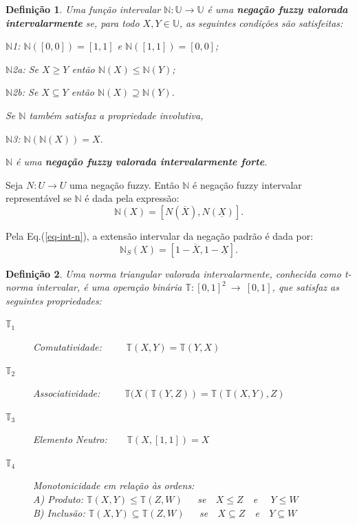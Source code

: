 \documentclass[tcc,capa]{texufpel}
\newtheorem{Def}{Defini\c c\~ao}
\begin{document}
\newpage

\begin{Def}\label{theo-neg}
Uma função intervalar $\mathbb{N}:\mathbb{U}\rightarrow
\mathbb{U}$ é uma \textbf{negação fuzzy valorada intervalarmente} se, para todo
$X,Y \in \mathbb{U}$, as seguintes condições são satisfeitas:
\begin{description}
   \item $\mathbb{N}$1: $\mathbb{N}([0,0]) = [1,1]$ e $\mathbb{N}([1,1]) = [0,0]$;
   \item $\mathbb{N}$2a: Se $X \geq Y$ então $\mathbb{N}(X)\leq
   \mathbb{N}(Y)$;
   \item $\mathbb{N}$2b: Se $X\subseteq Y$ então $\mathbb{N}(X)\supseteq \mathbb{N}(Y)$.
\end{description}
Se $\mathbb{N}$ também satisfaz a propriedade involutiva, 
\begin{description}
\item $\mathbb{N}$3: $\mathbb{N}(\mathbb{N}(X)) = X$.
\end{description}
$\mathbb{N}$
é uma \textbf{negação fuzzy valorada intervalarmente forte}.
\end{Def}

Seja $N: U \rightarrow U$ uma negação fuzzy. Então $\mathbb{N}$
é negação fuzzy intervalar representável se $\mathbb{N}$ é dada pela expressão:
\begin{equation}\label{eq-int-n}
\mathbb{N}(X)=[N(\overline{X}),N(\underline{X})].
\end{equation}

Pela Eq.(\ref{eq-int-n}), a extensão intervalar da negação padrão é dada por:
\begin{equation}\label{eq-int-n}
\mathbb{N}_S(X)=[1-\overline{X},1-\underline{X}].
\end{equation}

\begin{Def} Uma norma triangular valorada intervalarmente, conhecida como t-norma intervalar, é uma operação binária $\mathbb{T}:[0,1]^2~\rightarrow~[0,1]$, que satisfaz as seguintes propriedades:
\begin{description}
  \item [$\mathbb{T}_1$] Comutatividade:~~~~~$\mathbb{T}(X,Y) = \mathbb{T}(Y,X)$
  \item [$\mathbb{T}_2$] Associatividade:~~~~~$\mathbb{T}(X(\mathbb{T}(Y,Z))=\mathbb{T}(\mathbb{T}(X,Y),Z)$
  \item [$\mathbb{T}_3$] Elemento Neutro:~~~~$\mathbb{T}(X,[1,1])=X$
  \item [$\mathbb{T}_4$] Monotonicidade em relação às ordens:\\
  A) Produto: $\mathbb{T}(X,Y)\leq \mathbb{T}(Z,W)$~~~se~~$X\leq Z$~~e~~ $Y\leq W$\\
  B) Inclusão: $\mathbb{T}(X,Y)\subseteq \mathbb{T}(Z,W)$~~~se~~$X\subseteq Z$~~e~~$Y\subseteq W$
\end{description}
\end{Def}
\end{document}
